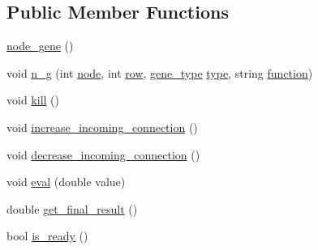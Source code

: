 \subsection*{Public Member Functions}
\begin{DoxyCompactItemize}
\item 
\hyperlink{class_a_n_n___u_s_m_1_1node__gene_a2bd112df73cd91917c32456d7b74c19d}{node\-\_\-gene} ()
\item 
void \hyperlink{class_a_n_n___u_s_m_1_1node__gene_a96099b1c7cb2d302f802fd13080f65e1}{n\-\_\-g} (int \hyperlink{class_a_n_n___u_s_m_1_1node__gene_a426387db0b455d5e07debcf1ce186100}{node}, int \hyperlink{class_a_n_n___u_s_m_1_1node__gene_acf1e1356443a2ea954570d9e048ef72c}{row}, \hyperlink{namespace_a_n_n___u_s_m_aa7f97f486244dd898592ba14dd7aa778}{gene\-\_\-type} \hyperlink{class_a_n_n___u_s_m_1_1node__gene_abe075ac0849a7b7bb2aca6fac57cea00}{type}, string \hyperlink{class_a_n_n___u_s_m_1_1node__gene_a3191d2de9879934a6cd1331b2ffa68b8}{function})
\item 
void \hyperlink{class_a_n_n___u_s_m_1_1node__gene_a966ec45b4c692bf43244ae4fdc09a1c9}{kill} ()
\item 
void \hyperlink{class_a_n_n___u_s_m_1_1node__gene_ac9061b6f8289758f3b2f6a4fe27d0f88}{increase\-\_\-incoming\-\_\-connection} ()
\item 
void \hyperlink{class_a_n_n___u_s_m_1_1node__gene_a6fb9a8966511bc122c6fd12aa78ce9f8}{decrease\-\_\-incoming\-\_\-connection} ()
\item 
void \hyperlink{class_a_n_n___u_s_m_1_1node__gene_a50bf322d336d5783e74a6730f5854afa}{eval} (double value)
\item 
double \hyperlink{class_a_n_n___u_s_m_1_1node__gene_aa8261e2582b345e6202c8bcb88c45012}{get\-\_\-final\-\_\-result} ()
\item 
bool \hyperlink{class_a_n_n___u_s_m_1_1node__gene_a7b933ce737040d389da27d6569cb02f2}{is\-\_\-ready} ()
\end{DoxyCompactItemize}
